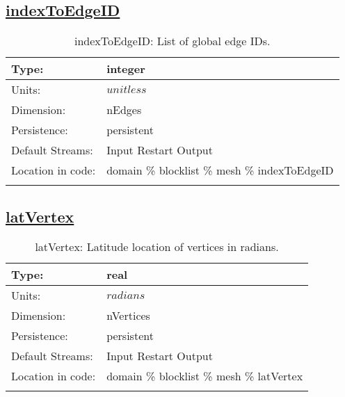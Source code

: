\subsection[indexToEdgeID]{\hyperref[sec:var_tab_mesh]{indexToEdgeID}}
\label{subsec:var_sec_mesh_indexToEdgeID}
\begin{center}
\begin{longtable}{| p{2.0in} | p{4.0in} |}
        \hline 
        Type: & integer \\
        \hline 
        Units: & $unitless$ \\
        \hline 
        Dimension: & nEdges \\
        \hline 
        Persistence: & persistent \\
        \hline 
		 Default Streams: & Input Restart Output  \\
        \hline 
		 Location in code: & domain \% blocklist \% mesh \% indexToEdgeID \\
		 \hline 
    \caption{indexToEdgeID: List of global edge IDs.}
\end{longtable}
\end{center}
\subsection[latVertex]{\hyperref[sec:var_tab_mesh]{latVertex}}
\label{subsec:var_sec_mesh_latVertex}
\begin{center}
\begin{longtable}{| p{2.0in} | p{4.0in} |}
        \hline 
        Type: & real \\
        \hline 
        Units: & $radians$ \\
        \hline 
        Dimension: & nVertices \\
        \hline 
        Persistence: & persistent \\
        \hline 
		 Default Streams: & Input Restart Output  \\
        \hline 
		 Location in code: & domain \% blocklist \% mesh \% latVertex \\
		 \hline 
    \caption{latVertex: Latitude location of vertices in radians.}
\end{longtable}
\end{center}
